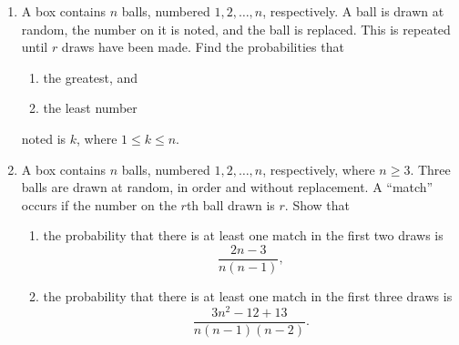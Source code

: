 \begin{problem}
    \begin{enumerate}
        \item A box contains $n$ balls, numbered $1, 2, \dots, n$, respectively. A ball is drawn at random, the number on it is noted, and the ball is replaced. This is repeated until $r$ draws have been made. Find the probabilities that
        \begin{enumerate}
            \item the greatest, and
            \item the least number
        \end{enumerate}
        noted is $k$, where $1 \leq k \leq n$.
        \item A box contains $n$ balls, numbered $1, 2, \dots, n$, respectively, where $n \geq 3$. Three balls are drawn at random, in order and without replacement. A ``match'' occurs if the number on the $r$th ball drawn is $r$. Show that
        \begin{enumerate}
            \item the probability that there is at least one match in the first two draws is \[\frac{2n-3}{n(n-1)},\]
            \item the probability that there is at least one match in the first three draws is \[\frac{3n^2 - 12 + 13}{n(n-1)(n-2)}.\]
        \end{enumerate}
    \end{enumerate}
\end{problem}